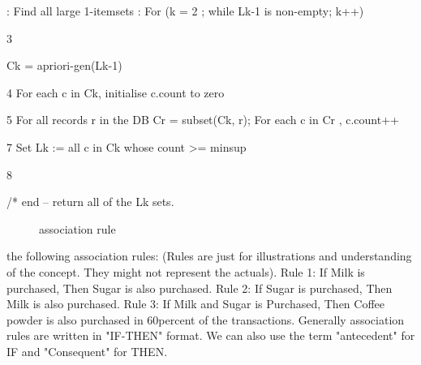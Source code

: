 \documentclass[10pt,a4paper]{article}
\begin{document}
{{:  Find all large 1-itemsets
:  For (k = 2 ; while Lk-1 is non-empty; k++)
\newline

3		{Ck = apriori-gen(Lk-1)
\newline

	4          For each c in Ck, initialise c.count to zero 
\newline

	5          For all records r in the DB
	{Cr = subset(Ck, r);  For each c in Cr , c.count++ }
\newline

	7             Set Lk := all c in Ck whose count >=  minsup
\newline

	8         }  /*  end   -- return all of the Lk sets.


\begin{center}
	\begin{figure}[!htbp]
		\centering
		\caption{association rule}
		\label{fig:usecase}
	\end{figure}
\end{center}  

the following association rules: (Rules are just for illustrations and understanding of the concept. They might not represent the actuals).
\newline
Rule 1: If Milk is purchased, Then Sugar is also purchased.
\newline
Rule 2:  If Sugar is purchased, Then Milk is also purchased.
\newline
Rule 3: If Milk and Sugar is Purchased, Then Coffee powder is also purchased in 60percent of the transactions.
\newline
Generally association rules are written in "IF-THEN" format. We can also use the term "antecedent" for IF and "Consequent" for THEN.


}}
\end{document}
